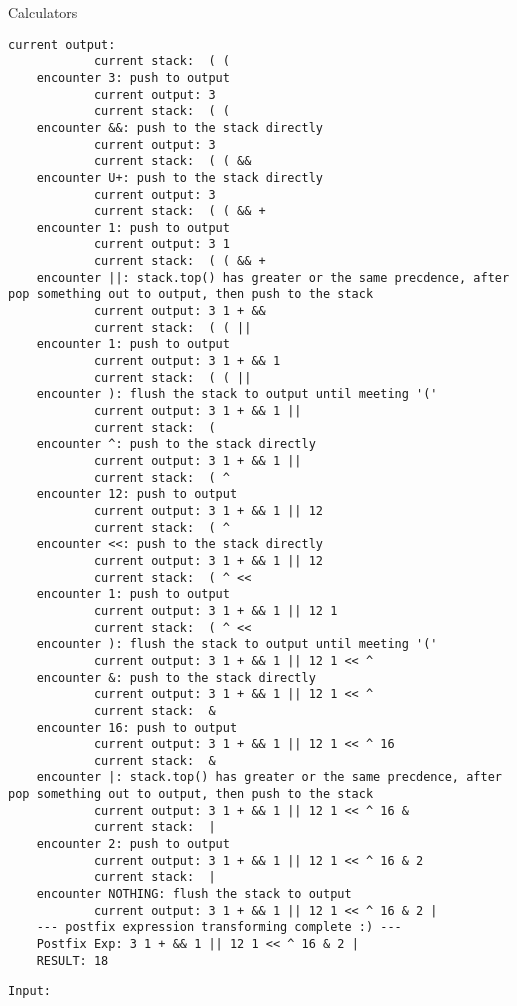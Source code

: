 \begin{homeworkProblem}{Calculators}
\begin{lstlisting}[breaklines=true]
            current output:
            current stack:  ( (
    encounter 3: push to output
            current output: 3
            current stack:  ( (
    encounter &&: push to the stack directly
            current output: 3
            current stack:  ( ( &&
    encounter U+: push to the stack directly
            current output: 3
            current stack:  ( ( && +
    encounter 1: push to output
            current output: 3 1
            current stack:  ( ( && +
    encounter ||: stack.top() has greater or the same precdence, after pop something out to output, then push to the stack
            current output: 3 1 + &&
            current stack:  ( ( ||
    encounter 1: push to output
            current output: 3 1 + && 1
            current stack:  ( ( ||
    encounter ): flush the stack to output until meeting '('
            current output: 3 1 + && 1 ||
            current stack:  (
    encounter ^: push to the stack directly
            current output: 3 1 + && 1 ||
            current stack:  ( ^
    encounter 12: push to output
            current output: 3 1 + && 1 || 12
            current stack:  ( ^
    encounter <<: push to the stack directly
            current output: 3 1 + && 1 || 12
            current stack:  ( ^ <<
    encounter 1: push to output
            current output: 3 1 + && 1 || 12 1
            current stack:  ( ^ <<
    encounter ): flush the stack to output until meeting '('
            current output: 3 1 + && 1 || 12 1 << ^
    encounter &: push to the stack directly
            current output: 3 1 + && 1 || 12 1 << ^
            current stack:  &
    encounter 16: push to output
            current output: 3 1 + && 1 || 12 1 << ^ 16
            current stack:  &
    encounter |: stack.top() has greater or the same precdence, after pop something out to output, then push to the stack
            current output: 3 1 + && 1 || 12 1 << ^ 16 &
            current stack:  |
    encounter 2: push to output
            current output: 3 1 + && 1 || 12 1 << ^ 16 & 2
            current stack:  |
    encounter NOTHING: flush the stack to output
            current output: 3 1 + && 1 || 12 1 << ^ 16 & 2 |
    --- postfix expression transforming complete :) ---
    Postfix Exp: 3 1 + && 1 || 12 1 << ^ 16 & 2 |
    RESULT: 18
    \end{lstlisting}


    \begin{lstlisting}[breaklines=true]
    Input:


\end{lstlisting}
\end{homeworkProblem}
